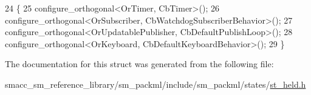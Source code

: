 \begin{DoxyCode}
24     \{
25         configure\_orthogonal<OrTimer, CbTimer>();   
26         configure\_orthogonal<OrSubscriber, CbWatchdogSubscriberBehavior>();
27         configure\_orthogonal<OrUpdatablePublisher, CbDefaultPublishLoop>();
28         configure\_orthogonal<OrKeyboard, CbDefaultKeyboardBehavior>();
29     \}
\end{DoxyCode}


The documentation for this struct was generated from the following file\+:\begin{DoxyCompactItemize}
\item 
smacc\+\_\+sm\+\_\+reference\+\_\+library/sm\+\_\+packml/include/sm\+\_\+packml/states/\hyperlink{st__held_8h}{st\+\_\+held.\+h}\end{DoxyCompactItemize}
